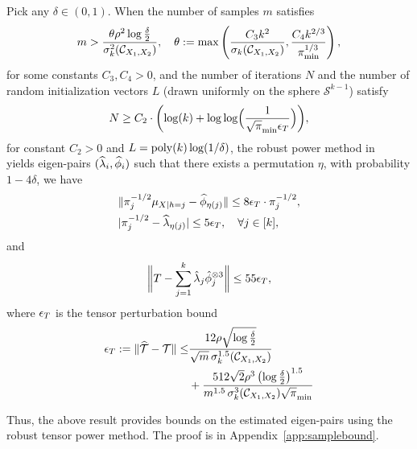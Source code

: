 \documentclass{article}
\begin{document}
\begin{theorem}\label{thm:samplebound}
Pick  any $\delta\in (0,1)$. When the number of samples $m$ satisfies
\[ m >\frac{\theta\rho^2  \log\frac{\delta}{2}}{\sigma^2_k(\Ccal_{X_1, X_2})},
\quad \theta:= \max\left(\frac{C_3 k^2}{\sigma_k( \Ccal_{X_1, X_2})}, \frac{C_4k^{2/3}\iffalse(1+\sigma_{k+1}(\Ccal_{X_1, X_2}))^2 \fi }{\pi_{\min}^{1/3}}\right),\] for some constants $C_3, C_4>0$, and the number of iterations $N$  and  the number of random initialization vectors $L$  (drawn uniformly on the sphere $\mathcal{S}^{k-1}$)  satisfy
\begin{align*}
  N \geq C_2 \cdot \biggl( \log(k) + \log\log\Bigl(
 \frac{1}{\sqrt{\pi}_{\min}\epsilon_T} \Bigr) \biggr),
\end{align*}
for constant $C_2>0$ and  $L = \operatorname{poly}(k) \log(1/\delta)$,  the robust power method in~\cite{AnandkumarEtal:community12} yields eigen-pairs $(\widehat{\lambda}_i, \widehat{\phi}_i)$ such that there exists a permutation $\eta$, with probability $1-4\delta$, we have
\begin{align*}
&\|\pi^{-1/2}_{j} \mu_{X|h=j}-\widehat{\phi}_{\eta(j)}\| \leq 8 \epsilon_T \cdot\pi^{-1/2}_{j}
, \\
&|\pi^{-1/2}_{j}-\widehat{\lambda}_{\eta(j)}| \leq  5\epsilon_T, \quad \forall j \in [k]
,
\end{align*}
and
\[
\biggl\|
T - \sum_{j=1}^k \hat\lambda_j \hat{\phi}_j^{\otimes 3}
\biggr\| \leq 55\epsilon_T,
\] where $\epsilon_T$ is the tensor perturbation bound
\begin{align*} \epsilon_T := \|\widehat{{\mathcal{T}}} - {\mathcal{T}}\| \leq&
\frac{12 \rho \sqrt{\log\frac{\delta}{2}}}{\sqrt{m} \, \sigma_k^{1.5}(\mathcal{C}_{X_1, X_2})} \\ &+ \frac{512 \sqrt{2} \rho^3 \left(\log\frac{\delta}{2}\right)^{1.5}}{m^{1.5} \,\sigma_k^{3}(\mathcal{C}_{X_1, X_2}) \sqrt{\pi}_{\min}}\end{align*}
\end{theorem}

Thus, the above result provides bounds on the estimated eigen-pairs using the robust tensor power method.
The proof is in Appendix~\ref{app:samplebound}.

\end{document}
